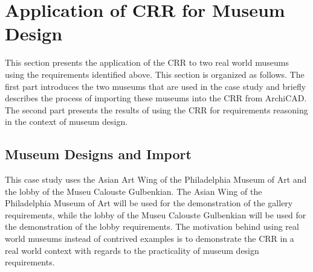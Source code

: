\documentclass[12pt]{ucthesis}
\begin{document}


\section{Application of CRR for Museum Design}
This section presents the application of the CRR to two real world museums using the requirements identified above. This section is organized as follows. The first part introduces the two museums that are used in the case study and briefly describes the process of importing these museums into the CRR from ArchiCAD. The second part presents the results of using the CRR for requirements reasoning in the context of museum design.




\subsection{Museum Designs and Import}
This case study uses the Asian Art Wing of the Philadelphia Museum of Art \cite{PhiladelphiaArtMuseum} and the lobby of the Museu Calouste Gulbenkian. The Asian Wing of the Philadelphia Museum of Art will be used for the demonstration of the gallery requirements, while the lobby of the Museu Calouste Gulbenkian will be used for the demonstration of the lobby requirements. The motivation behind using real world museums instead of contrived examples is to demonstrate the CRR in a real world context with regards to the practicality of museum design requirements.
\end{document}

